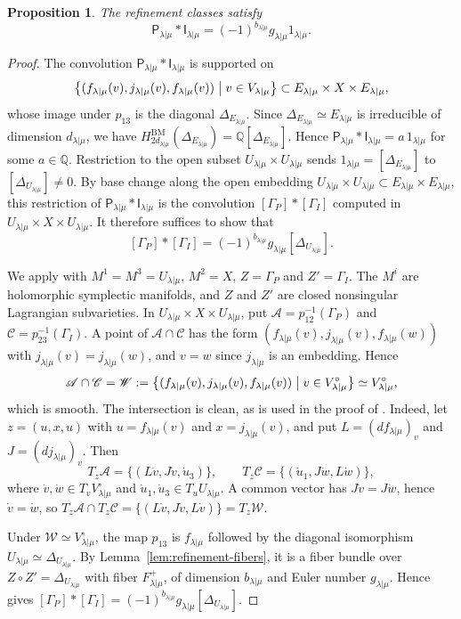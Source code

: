 \documentclass[11pt,a4paper]{amsart}
\newtheorem{proposition}[theorem]{Proposition}
\theoremstyle{definition}
\theoremstyle{remark}
\newcommand{\Q}{\mathbb Q}
\newcommand{\BM}{\mathrm{BM}}
\newcommand{\lm}{\lambda|\mu}
\numberwithin{equation}{section}
\begin{document}
\begin{proposition}\label{prop:PI}
The refinement classes satisfy
\begin{equation}\label{eq:PI}
\mathsf P_{\lm}*\mathsf I_{\lm}=(-1)^{b_{\lm}}g_{\lm}1_{\lm}.
\end{equation}
\end{proposition}
\begin{proof}
The convolution $\mathsf P_{\lm}*\mathsf I_{\lm}$ is supported on
$$
\bigl\{(f_{\lm}(v),j_{\lm}(v),f_{\lm}(v))\bigm| v\in V_{\lm}\bigr\}
\subset E_{\lm}\times X\times E_{\lm},
$$
whose image under $p_{13}$ is the diagonal $\Delta_{E_{\lm}}$. Since
$\Delta_{E_{\lm}}\simeq E_{\lm}$ is irreducible of dimension $d_{\lm}$, we
have $H^{\BM}_{2d_{\lm}}(\Delta_{E_{\lm}})=\Q[\Delta_{E_{\lm}}]$. Hence
$\mathsf P_{\lm}*\mathsf I_{\lm}=a\,1_{\lm}$ for some $a\in\Q$.
Restriction to the open subset $U_{\lm}\times U_{\lm}$ sends
$1_{\lm}=[\Delta_{E_{\lm}}]$ to $[\Delta_{U_{\lm}}]\ne0$. By base change along the open embedding
$U_{\lm}\times U_{\lm}\subset E_{\lm}\times E_{\lm}$, this restriction of
$\mathsf P_{\lm}*\mathsf I_{\lm}$ is the convolution $[\Gamma_P]*[\Gamma_I]$
computed in $U_{\lm}\times X\times U_{\lm}$. It
therefore suffices to
show that
$$
[\Gamma_P]*[\Gamma_I]=(-1)^{b_{\lm}}g_{\lm}[\Delta_{U_{\lm}}].
$$

We apply \cite[Lemma~8.5]{Nak} with $M^1=M^3=U_{\lm}$, $M^2=X$,
$Z=\Gamma_P$ and $Z'=\Gamma_I$. The $M^i$ are holomorphic symplectic
manifolds, and $Z$ and $Z'$ are closed nonsingular Lagrangian
subvarieties. In $U_{\lm}\times X\times U_{\lm}$, put
$\mathscr A=p_{12}^{-1}(\Gamma_P)$ and $\mathscr C=p_{23}^{-1}(\Gamma_I)$.
A point of $\mathscr A\cap\mathscr C$ has the form
$(f_{\lm}(v),j_{\lm}(v),f_{\lm}(w))$ with $j_{\lm}(v)=j_{\lm}(w)$, and
$v=w$ since $j_{\lm}$ is an embedding. Hence
$$
\mathscr A\cap\mathscr C
=\mathscr W:=\bigl\{(f_{\lm}(v),j_{\lm}(v),f_{\lm}(v))\bigm| v\in V^\circ_{\lm}\bigr\}
\simeq V^\circ_{\lm},
$$
which is smooth. The intersection is clean, as is used in the proof of
\cite[Lemma~8.5]{Nak}. Indeed, let $z=(u,x,u)$ with $u=f_{\lm}(v)$ and
$x=j_{\lm}(v)$, and put $L=(df_{\lm})_v$ and $J=(dj_{\lm})_v$. Then
$$
T_z\mathscr A=\{(L\dot v,J\dot v,\dot u_3)\},\qquad
T_z\mathscr C=\{(\dot u_1,J\dot w,L\dot w)\},
$$
where $\dot v,\dot w\in T_vV^\circ_{\lm}$ and
$\dot u_1,\dot u_3\in T_uU_{\lm}$. A common vector has $J\dot v=J\dot w$,
hence $\dot v=\dot w$, so
$T_z\mathscr A\cap T_z\mathscr C=\{(L\dot v,J\dot v,L\dot v)\}=T_z\mathscr W$.

Under $\mathscr W\simeq V^\circ_{\lm}$, the map $p_{13}$ is $f_{\lm}$ followed by
the diagonal isomorphism $U_{\lm}\simeq\Delta_{U_{\lm}}$. By
Lemma~\ref{lem:refinement-fibers}, it is a fiber bundle over
$Z\circ Z'=\Delta_{U_{\lm}}$ with fiber $F_{\lm}^+$, of dimension
$b_{\lm}$ and Euler number $g_{\lm}$. Hence \cite[Lemma~8.5]{Nak} gives
$[\Gamma_P]*[\Gamma_I]=(-1)^{b_{\lm}}g_{\lm}[\Delta_{U_{\lm}}]$.
\end{proof}
\end{document}
